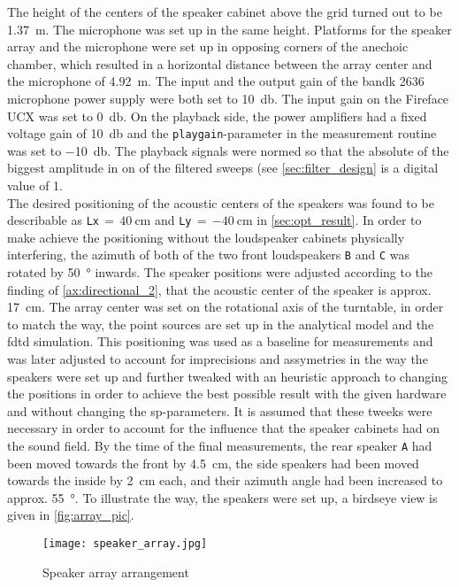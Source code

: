 The height of the centers of the speaker cabinet above the grid turned out to be \SI{1.37}{\meter}. The microphone was set up in the same height. Platforms for the speaker array and the microphone were set up in opposing corners of the anechoic chamber, which resulted in a horizontal distance between the array center and the microphone of \SI{4.92}{\meter}.
The input and the output gain of the \gls{bandk} 2636 microphone power supply were both set to \SI{+10}{\decibel}. The input gain on the Fireface UCX was set to \SI{0}{\decibel}. On the playback side, the power amplifiers had a fixed voltage gain of \SI{+10}{\decibel} and the \texttt{playgain}-parameter in the measurement routine was set to \SI{-10}{\decibel}. The playback signals were normed so that the absolute of the biggest amplitude in on of the filtered sweeps (see \autoref{sec:filter_design} is a digital value of 1.\\
The desired positioning of the acoustic centers of the speakers was found to be describable as \texttt{Lx}$\,=\,\SI{40}{\centi\meter}$ and \texttt{Ly}$\,=\,\SI{-40}{\centi\meter}$ in \autoref{sec:opt_result}. In order to make achieve the positioning without the loudspeaker cabinets physically interfering, the azimuth of both of the two front loudspeakers \texttt{B} and \texttt{C} was rotated by \SI{50}{\degree} inwards. The speaker positions were adjusted according to the finding of \autoref{ax:directional_2}, that the acoustic center of the speaker is approx. \SI{17}{\centi\meter}. The array center was set on the rotational axis of the turntable, in order to match the way, the point sources are set up in the analytical model and the \gls{fdtd} simulation.
This positioning was used as a baseline for measurements and was later adjusted to account for imprecisions and assymetries in the way the speakers were set up and further tweaked with an heuristic approach to changing the positions in order to achieve the best possible result with the given hardware and without changing the \gls{sp}-parameters. It is assumed that these tweeks were necessary in order to account for the influence that the speaker cabinets had on the sound field. By the time of the final measurements, the rear speaker \texttt{A} had been moved towards the front by \SI{4.5}{\centi\meter}, the side speakers had been moved towards the inside by \SI{2}{\centi\meter} each, and their azimuth angle had been increased to approx. \SI{55}{\degree}.
To illustrate the way, the speakers were set up, a birdseye view is given in \autoref{fig:array_pic}.
\begin{figure}[h]
	\centering
    \texttt{[image: speaker\_array.jpg]}
    \label{fig:array_pic}
    \caption{Speaker array arrangement}
\end{figure}

